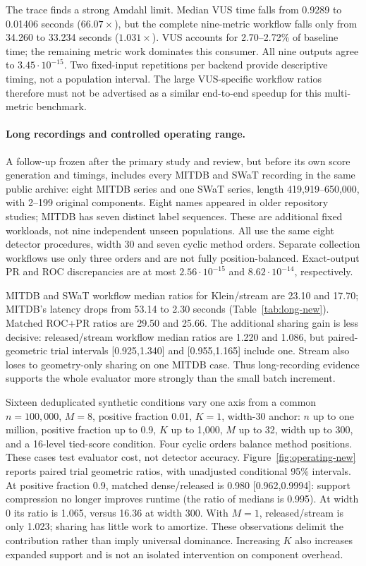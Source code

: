 The trace finds a strong Amdahl limit. Median VUS time falls from 0.9289 to
0.01406 seconds ($66.07\times$), but the complete nine-metric workflow falls
only from 34.260 to 33.234 seconds ($1.031\times$). VUS accounts for
2.70--2.72\% of baseline time; the remaining metric work dominates this
consumer. All nine outputs agree to $3.45\cdot10^{-15}$. Two fixed-input
repetitions per backend provide descriptive timing, not a population interval.
The large VUS-specific workflow ratios therefore must not be advertised as a
similar end-to-end speedup for this multi-metric benchmark.

\paragraph{Long recordings and controlled operating range.}
A follow-up frozen after the primary study and review, but before its own
score generation and timings, includes every MITDB and SWaT recording in the
same public archive: eight MITDB series and one SWaT series, length
419,919--650,000, with 2--199 original components. Eight names appeared in
older repository studies; MITDB has seven distinct label sequences. These are
additional fixed workloads, not nine independent unseen populations.
All use the same eight detector procedures, width 30 and seven cyclic method
orders. Separate collection workflows use only three orders and are not fully
position-balanced. Exact-output PR and ROC discrepancies are at most
$2.56\cdot10^{-15}$ and $8.62\cdot10^{-14}$, respectively.

MITDB and SWaT workflow median ratios for Klein/stream are 23.10 and 17.70;
MITDB's latency drops from 53.14 to 2.30 seconds
(Table~\ref{tab:long-new}). Matched ROC+PR ratios are 29.50 and 25.66.
The additional sharing gain is less decisive: released/stream workflow
median ratios are 1.220 and 1.086, but paired-geometric trial intervals
[0.925,1.340] and [0.955,1.165] include one. Stream also loses to
geometry-only sharing on one MITDB case. Thus long-recording evidence supports
the whole evaluator more strongly than the small batch increment.

Sixteen deduplicated synthetic conditions vary one axis from a common
$n=100{,}000$, $M=8$, positive fraction 0.01, $K=1$, width-30 anchor:
$n$ up to one million, positive fraction up to 0.9, $K$ up to 1,000,
$M$ up to 32, width up to 300, and a 16-level tied-score condition.
Four cyclic orders balance method positions. These cases test evaluator cost,
not detector accuracy. Figure~\ref{fig:operating-new} reports paired trial
geometric ratios, with unadjusted conditional 95\% intervals.
At positive fraction 0.9, matched dense/released is 0.980 [0.962,0.9994]:
support compression no longer improves runtime (the ratio of medians is
0.995). At width 0 its ratio is 1.065, versus 16.36 at width 300. With
$M=1$, released/stream is only 1.023; sharing has little work to amortize.
These observations delimit the contribution rather than imply universal
dominance. Increasing $K$ also increases expanded support and is not an
isolated intervention on component overhead.

